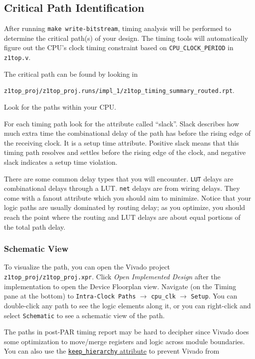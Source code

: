 \documentclass[11pt]{article}
\begin{document}
\subsection{Critical Path Identification}
After running \verb|make write-bitstream|, timing analysis will be performed to determine the critical path(s) of your design.
The timing tools will automatically figure out the CPU's clock timing constraint based on \verb|CPU_CLOCK_PERIOD| in \verb|z1top.v|.

The critical path can be found by looking in

\verb|z1top_proj/z1top_proj.runs/impl_1/z1top_timing_summary_routed.rpt|.

Look for the paths within your CPU.

For each timing path look for the attribute called ``slack''.
Slack describes how much extra time the combinational delay of the path has before the rising edge of the receiving clock.
It is a setup time attribute.
Positive slack means that this timing path resolves and settles before the rising edge of the clock, and negative slack indicates a setup time violation.

There are some common delay types that you will encounter.
\verb|LUT| delays are combinational delays through a LUT.
\verb|net| delays are from wiring delays. They come with a fanout attribute which you should aim to minimize.
Notice that your logic paths are usually dominated by routing delay; as you optimize, you should reach the point where the routing and LUT delays are about equal portions of the total path delay.

\subsubsection{Schematic View}
To visualize the path, you can open the Vivado project \verb|z1top_proj/z1top_proj.xpr|.
Click \textit{Open Implemented Design} after the implementation to open the Device Floorplan view.
Navigate (on the Timing pane at the bottom) to \verb|Intra-Clock Paths| $\rightarrow$ \verb|cpu_clk| $\rightarrow$ \verb|Setup|.
You can double-click any path to see the logic elements along it, or you can right-click and select \verb|Schematic| to see a schematic view of the path.

The paths in post-PAR timing report may be hard to decipher since Vivado does some optimization to move/merge registers and logic across module boundaries.
You can also use the \href{https://www.xilinx.com/support/answers/54778.html}{\texttt{keep\_hierarchy} attribute} to prevent Vivado from 
\end{document}
